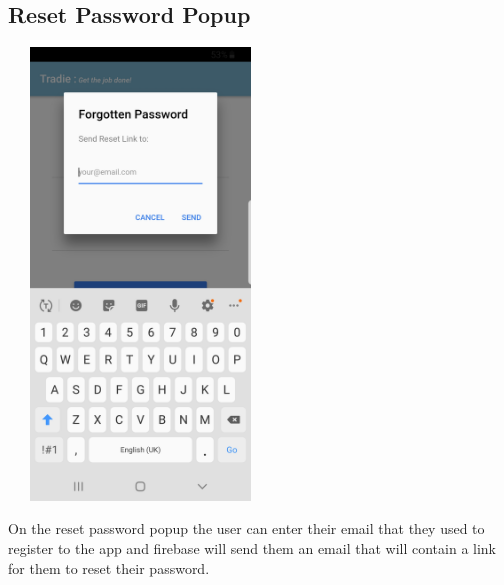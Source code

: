 \subsection{Reset Password Popup}
\begin{center}    
	\includegraphics[width=7cm, height=12cm]{img/forgotpassword.jpg}
\end{center}
On the reset password popup the user can enter their email that they used to register to the app and firebase will send them an email that will contain a link for them to reset their password.
